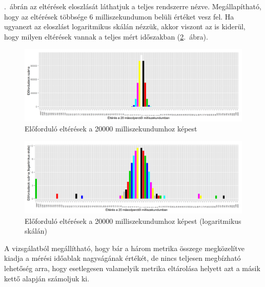 \documentclass[a4paper,10pt,titlepage]{article}
\begin{document}
.~ábrán az eltérések eloszlását láthatjuk a teljes rendszerre nézve. Megállapítható, hogy az eltérések többsége 6 milliszekundumon belüli értéket vesz fel. Ha ugyanezt az eloszlást logaritmikus skálán nézzük, akkor viszont az is kiderül, hogy milyen eltérések vannak a teljes mért időszakban (\ref{fig:cpu_run_wait_ready-diff-dist-log}.~ábra).

\begin{figure}[ht!]
\centering
\includegraphics[width=1.00\textwidth]{figures/cpu_run_wait_ready-diff-dist-20120826230140-20120924083120.png}
\caption{ Előforduló eltérések a 20000 milliszekundumhoz képest \label{fig:cpu_run_wait_ready-diff-dist}}
\end{figure}

\begin{figure}[ht!]
\centering
\includegraphics[width=1.00\textwidth]{figures/cpu_run_wait_ready-diff-dist-log-20120826230140-20120924083120.png}
\caption{ Előforduló eltérések a 20000 milliszekundumhoz képest (logaritmikus skálán)\label{fig:cpu_run_wait_ready-diff-dist-log}}
\end{figure}

A vizsgálatból megállítható, hogy bár a három metrika összege megközelítve kiadja a mérési időablak nagyságának értékét, de nincs teljesen megbízható lehetőség arra, hogy esetlegesen valamelyik metrika eltárolása helyett azt a másik kettő alapján számoljuk ki.
\end{document}
